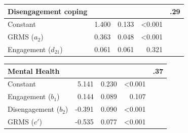 \documentclass[
  11pt,
]{book}
\begin{document}
\begin{longtable}[]{@{}lrrrr@{}}
\toprule\noalign{}
Disengagement coping & & & & .29 \\
\midrule\noalign{}
\endhead
\bottomrule\noalign{}
\endlastfoot
Constant & 1.400 & 0.133 & \textless0.001 & \\
GRMS (\(a_2\)) & 0.363 & 0.048 & \textless0.001 & \\
Engagement (\(d_{21}\)) & 0.061 & 0.061 & 0.321 & \\
\end{longtable}

\begin{longtable}[]{@{}lrrrr@{}}
\toprule\noalign{}
Mental Health & & & & .37 \\
\midrule\noalign{}
\endhead
\bottomrule\noalign{}
\endlastfoot
Constant & 5.141 & 0.230 & \textless0.001 & \\
Engagement (\(b_1\)) & 0.144 & 0.089 & 0.107 & \\
Disengagement (\(b_2\)) & -0.391 & 0.090 & \textless0.001 & \\
GRMS (\(c'\)) & -0.535 & 0.077 & \textless0.001 & \\
\end{longtable}
\end{document}
